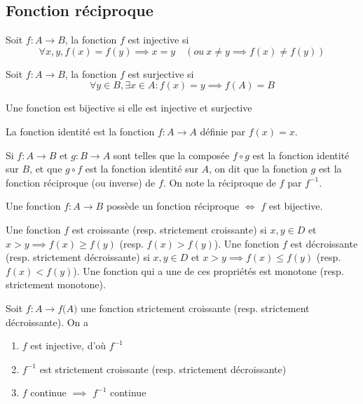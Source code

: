 	\subsection{Fonction réciproque}
		\begin{mydef}
			Soit $f:A\longrightarrow B$, la fonction $f$ est injective si \[\forall x,y, f(x)=f(y)\implies x=y\quad(ou~x\neq y\implies f(x)\neq f(y))\]
		\end{mydef}
		\begin{mydef}
			Soit $f:A\longrightarrow B$, la fonction $f$ est surjective si \[\forall y\in B,\exists x\in A : f(x)=y\implies f(A)=B\]
		\end{mydef}
		\begin{mydef}
			Une fonction est bijective si elle est injective et surjective
		\end{mydef}
		\begin{mydef}
			La fonction identité est la fonction $f:A\longrightarrow A$ définie par $f(x)=x$.
		\end{mydef}
		\begin{mydef}
			Si $f:A\longrightarrow B$ et $g:B\longrightarrow A$ sont telles que la composée $f\circ g$ est la fonction identité sur $B$, et que $g\circ f$ est la fonction identité sur $A$, on dit que la fonction $g$ est la fonction réciproque (ou inverse) de $f$. On note la réciproque de $f$ par $f^{-1}$.
		\end{mydef}
		\begin{mythm}
			Une fonction $f:A\longrightarrow B$ possède un fonction réciproque $\Longleftrightarrow$ $f$ est bijective.
		\end{mythm}
		\begin{mydef}
			Une fonction $f$ est croissante (resp. strictement croissante) si $x,y\in D$ et $x>y\implies f(x)\geq f(y)$ (resp. $f(x)>f(y)$). Une fonction $f$ est décroissante (resp. strictement décroissante) si $x,y\in D$ et $x>y\implies f(x)\leq f(y)$ (resp. $f(x)<f(y)$). Une fonction qui a une de ces propriétés est monotone (resp. strictement monotone).
		\end{mydef}
		\begin{mythm}
			Soit $f:A\longrightarrow f\big(A\big)$ une fonction strictement croissante (resp. strictement décroissante). On a
			\begin{enumerate}[label =\alph*)]
				\item $f$ est injective, d'où $f^{-1}$
				\item $f^{-1}$ est strictement croissante (resp. strictement décroissante)
				\item $f$  continue $\implies$ $f^{-1}$ continue
			\end{enumerate}
		\end{mythm}